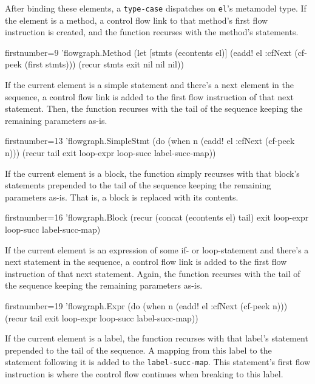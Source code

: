 \documentclass[11pt]{article}
\begin{document}
After binding these elements, a \verb|type-case| dispatches on \verb|el|'s
metamodel type.  If the element is a method, a control flow link to that
method's first flow instruction is created, and the function recurses with the
method's statements.

\begin{clojurecode*}{firstnumber=9}
        'flowgraph.Method
                   (let [stmts (econtents el)]
                     (eadd! el :cfNext (cf-peek (first stmts)))
                     (recur stmts exit nil nil nil))
\end{clojurecode*}

If the current element is a simple statement and there's a next element in the
sequence, a control flow link is added to the first flow instruction of that
next statement.  Then, the function recurses with the tail of the sequence
keeping the remaining parameters as-is.

\begin{clojurecode*}{firstnumber=13}
        'flowgraph.SimpleStmt
                   (do (when n (eadd! el :cfNext (cf-peek n)))
                       (recur tail exit loop-expr loop-succ label-succ-map))
\end{clojurecode*}

If the current element is a block, the function simply recurses with that
block's statements prepended to the tail of the sequence keeping the remaining
parameters as-is.  That is, a block is replaced with its contents.

\begin{clojurecode*}{firstnumber=16}
        'flowgraph.Block
                   (recur (concat (econtents el) tail)
                          exit loop-expr loop-succ label-succ-map)
\end{clojurecode*}

If the current element is an expression of some if- or loop-statement and
there's a next statement in the sequence, a control flow link is added to the
first flow instruction of that next statement.  Again, the function recurses
with the tail of the sequence keeping the remaining parameters as-is.

\begin{clojurecode*}{firstnumber=19}
        'flowgraph.Expr
                   (do (when n (eadd! el :cfNext (cf-peek n)))
                       (recur tail exit loop-expr loop-succ label-succ-map))
\end{clojurecode*}

If the current element is a label, the function recurses with that label's
statement prepended to the tail of the sequence.  A mapping from this label to
the statement following it is added to the \verb|label-succ-map|.  This
statement's first flow instruction is where the control flow continues when
breaking to this label.
\end{document}
